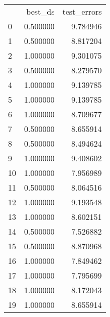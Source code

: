 \begin{tabular}{lrr}
 & best_ds & test_errors \\
0 & 0.500000 & 9.784946 \\
1 & 0.500000 & 8.817204 \\
2 & 1.000000 & 9.301075 \\
3 & 0.500000 & 8.279570 \\
4 & 1.000000 & 9.139785 \\
5 & 1.000000 & 9.139785 \\
6 & 1.000000 & 8.709677 \\
7 & 0.500000 & 8.655914 \\
8 & 0.500000 & 8.494624 \\
9 & 1.000000 & 9.408602 \\
10 & 1.000000 & 7.956989 \\
11 & 0.500000 & 8.064516 \\
12 & 1.000000 & 9.193548 \\
13 & 1.000000 & 8.602151 \\
14 & 0.500000 & 7.526882 \\
15 & 0.500000 & 8.870968 \\
16 & 1.000000 & 7.849462 \\
17 & 1.000000 & 7.795699 \\
18 & 1.000000 & 8.172043 \\
19 & 1.000000 & 8.655914 \\
\end{tabular}
